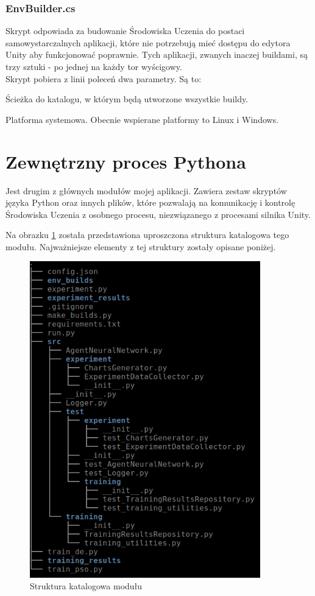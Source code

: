 \subsubsection{EnvBuilder.cs}
Skrypt odpowiada za budowanie Środowiska Uczenia do postaci samowystarczalnych aplikacji, które nie potrzebują mieć dostępu do edytora Unity aby funkcjonować poprawnie. Tych aplikacji, zwanych inaczej buildami, są trzy sztuki - po jednej na każdy tor wyścigowy. \\
Skrypt pobiera z linii poleceń dwa parametry. Są to:
\begin{itemize*}
\item Ścieżka do katalogu, w którym będą utworzone wszystkie buildy.
\item Platforma systemowa. Obecnie wspierane platformy to Linux i Windows.
\end{itemize*}

\newpage
\section{Zewnętrzny proces Pythona}
Jest drugim z głównych modułów mojej aplikacji. Zawiera zestaw skryptów języka Python oraz innych plików, które pozwalają na komunikację i kontrolę Środowiska Uczenia z osobnego procesu, niezwiązanego z procesami silnika Unity.

Na obrazku \ref{PythonProcessStructure} została przedstawiona uproszczona struktura katalogowa tego modułu. Najważniejsze elementy z tej struktury zostały opisane poniżej. 
\vspace{0.5cm}
\begin{figure}[H]
\centering
\includegraphics[width=10cm]{resources/figures/python_process_structure.png}
\caption{Struktura katalogowa modułu}
\label{PythonProcessStructure}
\end{figure}

